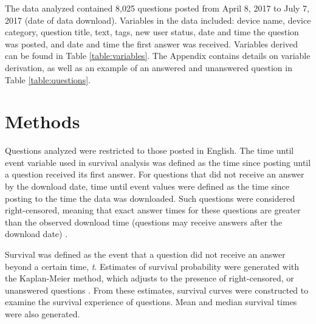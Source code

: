\documentclass[preprint]{elsarticle}\usepackage[]{graphicx}\usepackage[]{color}
\begin{document}
The data analyzed contained 8,025 questions posted from April 8, 2017 to July 7, 2017 (date of data download). Variables in the data included: device name, device category, question title, text, tags, new user status, date and time the question was posted, and date and time the first answer was received. Variables derived can be found in Table \ref{table:variables}. The Appendix contains details on variable derivation, as well as an example of an answered and unanswered question in Table \ref{table:questions}. 


\section{Methods}

Questions analyzed were restricted to those posted in English. The time until event variable used in survival analysis was defined as the time since posting until a question received its first answer. For questions that did not receive an answer by the download date, time until event values were defined as the time since posting to the time the data was downloaded. Such questions were considered right-censored, meaning that exact answer times for these questions are greater than the observed download time (questions may receive answers after the download date) \cite{Kleinbaum2011}. 

Survival was defined as the event that a question did not receive an answer beyond a certain time, \textit{t}. Estimates of survival probability were generated with the Kaplan-Meier method, which adjusts to the presence of right-censored, or unanswered questions \cite{Bland1998}. From these estimates, survival curves were constructed to examine the survival experience of questions. Mean and median survival times were also generated. 
\end{document}
